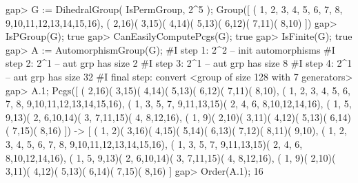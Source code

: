 \beginexample 
gap> G := DihedralGroup( IsPermGroup, 2^5 );
Group([ ( 1, 2, 3, 4, 5, 6, 7, 8, 9,10,11,12,13,14,15,16), 
  ( 2,16)( 3,15)( 4,14)( 5,13)( 6,12)( 7,11)( 8,10) ])
gap> IsPGroup(G);
true
gap> CanEasilyComputePcgs(G);
true
gap> IsFinite(G);
true
gap> A := AutomorphismGroup(G);
#I  step 1: 2^2 -- init automorphisms 
#I  step 2: 2^1 -- aut grp has size 2
#I  step 3: 2^1 -- aut grp has size 8
#I  step 4: 2^1 -- aut grp has size 32
#I  final step: convert
<group of size 128 with 7 generators>
gap> A.1;
Pcgs([ ( 2,16)( 3,15)( 4,14)( 5,13)( 6,12)( 7,11)( 8,10), 
  ( 1, 2, 3, 4, 5, 6, 7, 8, 9,10,11,12,13,14,15,16), 
  ( 1, 3, 5, 7, 9,11,13,15)( 2, 4, 6, 8,10,12,14,16), 
  ( 1, 5, 9,13)( 2, 6,10,14)( 3, 7,11,15)( 4, 8,12,16), 
  ( 1, 9)( 2,10)( 3,11)( 4,12)( 5,13)( 6,14)( 7,15)( 8,16) ]) -> 
[ ( 1, 2)( 3,16)( 4,15)( 5,14)( 6,13)( 7,12)( 8,11)( 9,10), 
  ( 1, 2, 3, 4, 5, 6, 7, 8, 9,10,11,12,13,14,15,16), 
  ( 1, 3, 5, 7, 9,11,13,15)( 2, 4, 6, 8,10,12,14,16), 
  ( 1, 5, 9,13)( 2, 6,10,14)( 3, 7,11,15)( 4, 8,12,16), 
  ( 1, 9)( 2,10)( 3,11)( 4,12)( 5,13)( 6,14)( 7,15)( 8,16) ]
gap> Order(A.1);
16
\endexample

